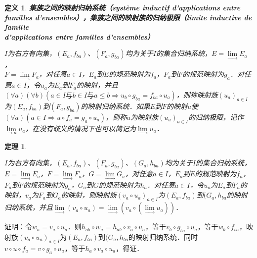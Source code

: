 \documentclass[12pt, a4paper, oneside]{book}
\newtheorem{theo}{定理}
\newtheorem{de}{定义}
\begin{document}
			\begin{de}
				\textbf{集族之间的映射归纳系统（système inductif d'applications entre familles d'ensembles），集族之间的映射族的归纳极限（limite inductive de famille \\d'applications entre familles d'ensembles）}
				\par
				$I$为右方有向集，$(E_a, f_{ba})$、$(F_a, g_{ba})$均为关于$I$的集合归纳系统，$E= \lim\limits_\to E_a$，\\$F= \lim\limits_\to F_a$，对任意$a\in I$，$E_a$到$E$的规范映射为$f_a$，$F_a$到$F$的规范映射为$g_a$．对任意$a\in I$，令$u_a$为$E_a$到$F_a$的映射，并且$(\forall a)(\forall b)(a\in I\text{与}b\in I\text{与}a\leq b\Rightarrow u_b\circ g_{ba}=f_{ba}\circ u_a)$，则称映射族$(u_a)_{a\in I}$为$(E_a, f_{ba})$到$(F_a, g_{ba})$的映射归纳系统．如果$E$到$F$的映射$u$使$(\forall a)(a\in I\Rightarrow u\circ f_a=g_a\circ u_a)$，则称$u$为映射族$(u_a)_{a\in I}$的归纳极限，记作$\lim\limits_{\to a} u_a$，在没有歧义的情况下也可以简记为$\lim\limits_\to u_a$．
			\end{de}
					
			\begin{theo}\label{theo186}
				\hfill\par
				$I$为右方有向集，$(E_a, f_{ba})$、$(F_a, g_{ba})$、$(G_a, h_{ba})$均为关于$I$的集合归纳系统，$E= \lim\limits_\to E_a$，$F= \lim\limits_\to F_a$，$G= \lim\limits_\to G_a$，对任意$a\in I$，$E_a$到$E$的规范映射为$f_a$，$F_a$到$F$的规范映射为$g_a$，$G_a$到$G$的规范映射为$h_a$．对任意$a\in I$，令$u_a$为$E_a$到$F_a$的映射，$v_a$为$F_a$到$G_a$的映射，则映射族$(v_a\circ u_a)_{a\in I}$为$(E_a, f_{ba})$到$(G_a, h_{ba}$的映射归纳系统，并且$\lim\limits_\to (v_a\circ u_a)=\lim\limits_\to (v_a\circ (\lim\limits_\to u_a))$．
			\end{theo}
			证明：令$w_a=v_a\circ u_a$．则$h_{ab}\circ w_a=h_{ab}\circ v_a\circ u_a$，等于$v_b\circ g_{ba}\circ u_a$，等于$w_b\circ f_{ba}$，映射族$(v_a\circ u_a)_{a\in I}$为$(E_a, f_{ba})$到$(G_a, h_{ba}$的映射归纳系统．同时$v\circ u\circ f_a=v\circ g_a\circ u_a$，等于$h_a\circ v_a\circ u_a$，得证．
					
\end{document}
